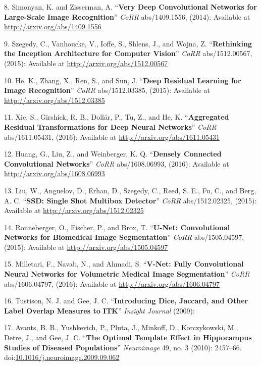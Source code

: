 \documentclass[11pt,]{article}
\begin{document}
\leavevmode\hypertarget{ref-Simonyan:2014}{}%
8. Simonyan, K. and Zisserman, A. ``\textbf{Very Deep Convolutional
Networks for Large-Scale Image Recognition}'' \emph{CoRR} abs/1409.1556,
(2014): Available at \url{http://arxiv.org/abs/1409.1556}

\leavevmode\hypertarget{ref-Szegedy:2015}{}%
9. Szegedy, C., Vanhoucke, V., Ioffe, S., Shlens, J., and Wojna, Z.
``\textbf{Rethinking the Inception Architecture for Computer Vision}''
\emph{CoRR} abs/1512.00567, (2015): Available at
\url{http://arxiv.org/abs/1512.00567}

\leavevmode\hypertarget{ref-He:2015}{}%
10. He, K., Zhang, X., Ren, S., and Sun, J. ``\textbf{Deep Residual
Learning for Image Recognition}'' \emph{CoRR} abs/1512.03385, (2015):
Available at \url{http://arxiv.org/abs/1512.03385}

\leavevmode\hypertarget{ref-Xie:2016}{}%
11. Xie, S., Girshick, R. B., Dollár, P., Tu, Z., and He, K.
``\textbf{Aggregated Residual Transformations for Deep Neural
Networks}'' \emph{CoRR} abs/1611.05431, (2016): Available at
\url{http://arxiv.org/abs/1611.05431}

\leavevmode\hypertarget{ref-Huang:2016}{}%
12. Huang, G., Liu, Z., and Weinberger, K. Q. ``\textbf{Densely
Connected Convolutional Networks}'' \emph{CoRR} abs/1608.06993, (2016):
Available at \url{http://arxiv.org/abs/1608.06993}

\leavevmode\hypertarget{ref-Liu:2015}{}%
13. Liu, W., Anguelov, D., Erhan, D., Szegedy, C., Reed, S. E., Fu, C.,
and Berg, A. C. ``\textbf{SSD: Single Shot Multibox Detector}''
\emph{CoRR} abs/1512.02325, (2015): Available at
\url{http://arxiv.org/abs/1512.02325}

\leavevmode\hypertarget{ref-Ronneberger:2015}{}%
14. Ronneberger, O., Fischer, P., and Brox, T. ``\textbf{U-Net:
Convolutional Networks for Biomedical Image Segmentation}'' \emph{CoRR}
abs/1505.04597, (2015): Available at
\url{http://arxiv.org/abs/1505.04597}

\leavevmode\hypertarget{ref-Milletari:2016}{}%
15. Milletari, F., Navab, N., and Ahmadi, S. ``\textbf{V-Net: Fully
Convolutional Neural Networks for Volumetric Medical Image
Segmentation}'' \emph{CoRR} abs/1606.04797, (2016): Available at
\url{http://arxiv.org/abs/1606.04797}

\leavevmode\hypertarget{ref-tustison2009}{}%
16. Tustison, N. J. and Gee, J. C. ``\textbf{Introducing Dice, Jaccard,
and Other Label Overlap Measures to ITK}'' \emph{Insight Journal}
(2009):

\leavevmode\hypertarget{ref-Avants:2010aa}{}%
17. Avants, B. B., Yushkevich, P., Pluta, J., Minkoff, D., Korczykowski,
M., Detre, J., and Gee, J. C. ``\textbf{The Optimal Template Effect in
Hippocampus Studies of Diseased Populations}'' \emph{Neuroimage} 49, no.
3 (2010): 2457--66.
doi:\href{https://doi.org/10.1016/j.neuroimage.2009.09.062}{10.1016/j.neuroimage.2009.09.062}
\end{document}
